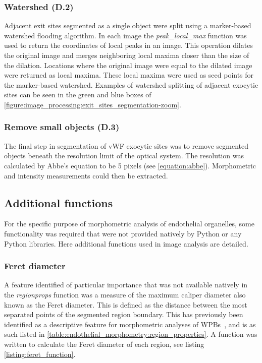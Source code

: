 \subsubsection{Watershed (D.2)}
Adjacent exit sites segmented as a single object were split using a marker-based watershed flooding algorithm. In each image the \emph{peak\_local\_max} function was used to return the coordinates of local peaks in an image. This operation dilates the original image and merges neighboring local maxima closer than the size of the dilation. Locations where the original image were equal to the dilated image were returned as local maxima. These local maxima were used as seed points for the marker-based watershed. Examples of watershed splitting of adjacent exocytic sites can be seen in the green and blue boxes of \autoref{figure:image_processing:exit_sites_segmentation-zoom}.

\subsubsection{Remove small objects (D.3)}
The final step in segmentation of vWF exocytic sites was to remove segmented objects beneath the resolution limit of the optical system. The resolution was calculated by Abbe's equation to be 5 pixels (see \autoref{equation:abbe}). Morphometric and intensity measurements could then be extracted.

\subsection{Additional functions}
\label{endothelial_morphometry:image_processing:additiona_functions}
For the specific purpose of morphometric analysis of endothelial organelles, some functionality was required that were not provided natively by Python or any Python libraries. Here additional functions used in image analysis are detailed.

\subsubsection{Feret diameter}
A feature identified of particular importance that was not available natively in the \emph{regionprops} function was a measure of the maximum caliper diameter also known as the Feret diameter. This is defined as the distance between the most separated points of the segmented region boundary. This has previously been identified as a descriptive feature for morphometric analyses of WPBs~\cite{Ferraro2014}, and is as such listed in \autoref{table:endothelial_morphometry:region_properties}. A function was written to calculate the Feret diameter of each region, see listing \autoref{listing:feret_function}.

